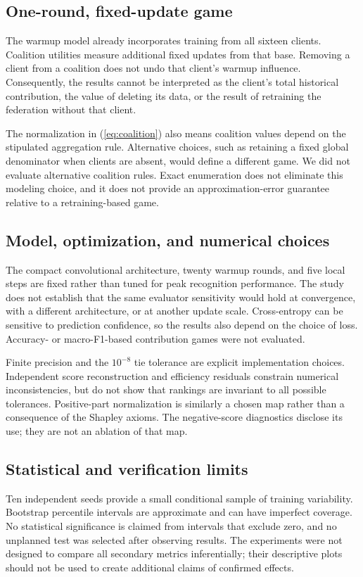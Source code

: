 \documentclass[conference,letterpaper]{IEEEtran}
\begin{document}
\subsection{One-round, fixed-update game}
The warmup model already incorporates training from all sixteen clients. Coalition utilities measure additional fixed updates from that base. Removing a client from a coalition does not undo that client's warmup influence. Consequently, the results cannot be interpreted as the client's total historical contribution, the value of deleting its data, or the result of retraining the federation without that client.

The normalization in (\ref{eq:coalition}) also means coalition values depend on the stipulated aggregation rule. Alternative choices, such as retaining a fixed global denominator when clients are absent, would define a different game. We did not evaluate alternative coalition rules. Exact enumeration does not eliminate this modeling choice, and it does not provide an approximation-error guarantee relative to a retraining-based game.

\subsection{Model, optimization, and numerical choices}
The compact convolutional architecture, twenty warmup rounds, and five local steps are fixed rather than tuned for peak recognition performance. The study does not establish that the same evaluator sensitivity would hold at convergence, with a different architecture, or at another update scale. Cross-entropy can be sensitive to prediction confidence, so the results also depend on the choice of loss. Accuracy- or macro-F1-based contribution games were not evaluated.

Finite precision and the $10^{-8}$ tie tolerance are explicit implementation choices. Independent score reconstruction and efficiency residuals constrain numerical inconsistencies, but do not show that rankings are invariant to all possible tolerances. Positive-part normalization is similarly a chosen map rather than a consequence of the Shapley axioms. The negative-score diagnostics disclose its use; they are not an ablation of that map.

\subsection{Statistical and verification limits}
Ten independent seeds provide a small conditional sample of training variability. Bootstrap percentile intervals are approximate and can have imperfect coverage. No statistical significance is claimed from intervals that exclude zero, and no unplanned test was selected after observing results. The experiments were not designed to compare all secondary metrics inferentially; their descriptive plots should not be used to create additional claims of confirmed effects.
\end{document}
